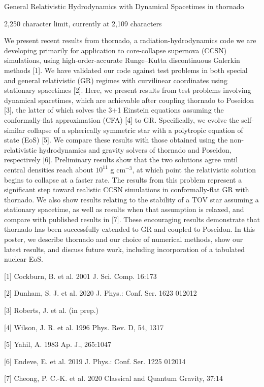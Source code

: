 \documentclass{article}
\begin{document}
\begin{center}

{\Large General Relativistic Hydrodynamics with Dynamical Spacetimes in thornado}

\end{center}
2,250 character limit, currently at 2,109 characters\vspace{1em}

We present recent results from thornado, a radiation-hydrodynamics code we are developing primarily for application to core-collapse supernova (CCSN) simulations, using high-order-accurate Runge--Kutta discontinuous Galerkin methods [1]. We have validated our code against test problems in both special and general relativistic (GR) regimes with curvilinear coordinates using stationary spacetimes [2]. Here, we present results from test problems involving dynamical spacetimes, which are achievable after coupling thornado to Poseidon [3], the latter of which solves the 3+1 Einstein equations assuming the conformally-flat approximation (CFA) [4] to GR. Specifically, we evolve the self-similar collapse of a spherically symmetric star with a polytropic equation of state (EoS) [5]. We compare these results with those obtained using the non-relativistic hydrodynamics and gravity solvers of thornado and Poseidon, respectively [6]. Preliminary results show that the two solutions agree until central densities reach about $10^{11}$ g cm$^{-3}$, at which point the relativistic solution begins to collapse at a faster rate. The results from this problem represent a significant step toward realistic CCSN simulations in conformally-flat GR with thornado. We also show results relating to the stability of a TOV star assuming a stationary spacetime, as well as results when that assumption is relaxed, and compare with published results in [7]. These encouraging results demonstrate that thornado has been successfully extended to GR and coupled to Poseidon. In this poster, we describe thornado and our choice of numerical methods, show our latest results, and discuss future work, including incorporation of a tabulated nuclear EoS.

[1] Cockburn, B. et al. 2001 J. Sci. Comp. 16:173

[2] Dunham, S. J. et al. 2020 J. Phys.: Conf. Ser. 1623 012012

[3] Roberts, J. et al. (in prep.)

[4] Wilson, J. R. et al. 1996 Phys. Rev. D, 54, 1317

[5] Yahil, A. 1983 Ap. J., 265:1047

[6] Endeve, E. et al. 2019 J. Phys.: Conf. Ser. 1225 012014

[7] Cheong, P. C.-K. et al. 2020 Classical and Quantum Gravity, 37:14
\end{document}
